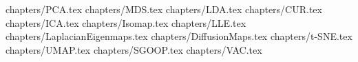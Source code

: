 \clearpage 
 {chapters/PCA.tex}
\clearpage
 {chapters/MDS.tex}
\clearpage
 {chapters/LDA.tex}
\clearpage
 {chapters/CUR.tex}
\clearpage
 {chapters/ICA.tex}
\clearpage
 {chapters/Isomap.tex}
\clearpage
 {chapters/LLE.tex}
\clearpage
 {chapters/LaplacianEigenmaps.tex}
\clearpage
 {chapters/DiffusionMaps.tex}
\clearpage
 {chapters/t-SNE.tex}
\clearpage
 {chapters/UMAP.tex}
\clearpage
 {chapters/SGOOP.tex}
\clearpage
 {chapters/VAC.tex}